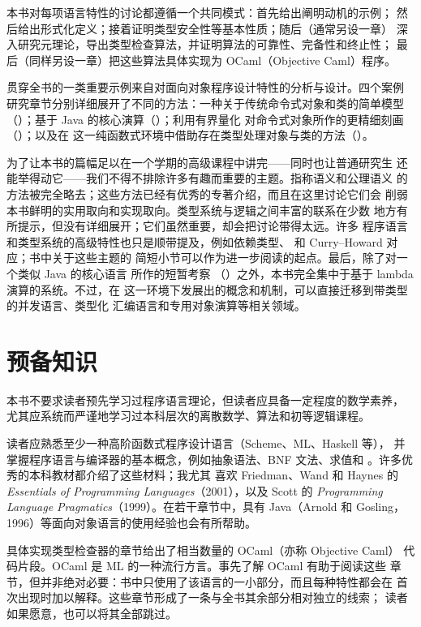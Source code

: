 本书对每项语言特性的讨论都遵循一个共同模式：首先给出阐明动机的示例；
然后给出形式化定义；接着证明类型安全性等基本性质；随后（通常另设一章）
深入研究元理论，导出类型检查算法，并证明算法的可靠性、完备性和终止性；
最后（同样另设一章）把这些算法具体实现为 OCaml（Objective Caml）程序。

贯穿全书的一类重要示例来自对面向对象程序设计特性的分析与设计。四个案例
研究章节分别详细展开了不同的方法：一种关于传统命令式对象和类的简单模型
（）；基于 Java 的核心演算（）；利用有界量化
对命令式对象所作的更精细刻画（）；以及在 \SystemFomegasub{}
这一纯函数式环境中借助存在类型处理对象与类的方法（）。

为了让本书的篇幅足以在一个学期的高级课程中讲完——同时也让普通研究生
还能举得动它——我们不得不排除许多有趣而重要的主题。指称语义和公理语义
的方法被完全略去；这些方法已经有优秀的专著介绍，而且在这里讨论它们会
削弱本书鲜明的实用取向和实现取向。类型系统与逻辑之间丰富的联系在少数
地方有所提示，但没有详细展开；它们虽然重要，却会把讨论带得太远。许多
程序语言和类型系统的高级特性也只是顺带提及，例如依赖类型、
和 Curry--Howard 对应；书中关于这些主题的
简短小节可以作为进一步阅读的起点。最后，除了对一个类似 Java 的核心语言
所作的短暂考察
（）之外，本书完全集中于基于 lambda 演算的系统。不过，在
这一环境下发展出的概念和机制，可以直接迁移到带类型的并发语言、类型化
汇编语言和专用对象演算等相关领域。

\section*{预备知识}

本书不要求读者预先学习过程序语言理论，但读者应具备一定程度的数学素养，
尤其应系统而严谨地学习过本科层次的离散数学、算法和初等逻辑课程。

读者应熟悉至少一种高阶函数式程序设计语言（Scheme、ML、Haskell 等），
并掌握程序语言与编译器的基本概念，例如抽象语法、BNF 文法、求值和
。许多优秀的本科教材都介绍了这些材料；我尤其
喜欢 Friedman、Wand 和 Haynes 的
\emph{Essentials of Programming Languages}（2001），以及 Scott 的
\emph{Programming Language Pragmatics}（1999）。在若干章节中，具有
Java（Arnold 和 Gosling，1996）等面向对象语言的使用经验也会有所帮助。

具体实现类型检查器的章节给出了相当数量的 OCaml（亦称 Objective Caml）
代码片段。OCaml 是 ML 的一种流行方言。事先了解 OCaml 有助于阅读这些
章节，但并非绝对必要：书中只使用了该语言的一小部分，而且每种特性都会在
首次出现时加以解释。这些章节形成了一条与全书其余部分相对独立的线索；
读者如果愿意，也可以将其全部跳过。

